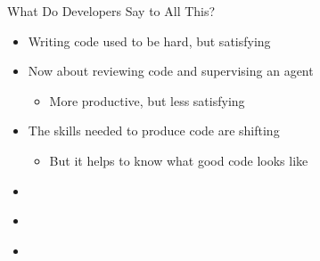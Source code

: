 \documentclass[
ps,
]{prosper}
\begin{document}
    
    
\begin{slide}{What Do Developers Say to All This?}

\begin{itemize}

\item Writing code used to be hard, but satisfying

\item Now about reviewing code and supervising an agent

  \begin{itemize}
    
  \item More productive, but less satisfying
    
  \end{itemize}

\item The skills needed to produce code are shifting

  \begin{itemize}
    
  \item But it helps to know what good code looks like
    
  \end{itemize}

\end{itemize}
  
\end{slide}


\begin{slide}{}

\begin{itemize}

\item 

\end{itemize}
  
\end{slide}


\begin{slide}{}

\begin{itemize}

\item 

\end{itemize}
  
\end{slide}


\begin{slide}{}

\begin{itemize}

\item 

\end{itemize}
  
\end{slide}






\end{document}

